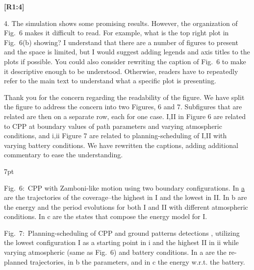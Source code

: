 \documentclass[10pt]{letter}
\newenvironment{formal}{%
  \def\FrameCommand{%
    \hspace{1pt}%
    {\color{red}\vrule width 2pt}%
    {\color{formalshade}\vrule width 4pt}%
    \colorbox{formalshade}%
  }%
  \MakeFramed{\advance\hsize-\width\FrameRestore}%
  \noindent\hspace{-4.55pt}%
  \begin{adjustwidth}{}{7pt}%
  \vspace{2pt}\vspace{2pt}%
}
{%
  \vspace{2pt}\end{adjustwidth}\endMakeFramed%
}
\begin{document}
{\hspace*{-4.5em}\textbf{[R1:4]}\vspace*{-1.9em}}


4. The simulation shows some promising results. However, the organization of Fig.~6 makes it difficult to read. For example, what is the top right plot in Fig.~6(b) showing? I understand that there are a number of figures to present and the space is limited, but I would suggest adding legends and axis titles to the plots if possible. You could also consider rewriting the caption of Fig.~6 to make it descriptive enough to be understood. Otherwise, readers have to repeatedly refer to the main text to understand what a specific plot is presenting.

{\color{blue} 


{\hspace*{-4.5em}{[R1:4]}\vspace*{-1.9em}}

Thank you for the concern regarding the readability of the figure. We have split the figure to address the concern into two Figures, 6 and 7. Subfigures that are related are then on a separate row, each for one case. I,II in Figure 6 are related to CPP at boundary values of path parameters and varying atmospheric conditions, and i,ii Figure 7 are related to planning-scheduling of I,II with varying battery conditions. We have rewritten the captions, adding additional commentary to ease the understanding.

\begin{formal}
  \footnotesize
  
  {\color{blue}Fig.~6:~\color{blue}CPP with Zamboni-like motion using two boundary configurations. In \hyperref[fig:stat]{a} are the trajectories of the coverage--the highest in {\color{red}I} and the lowest in {\color{red}II}. In {\color{red}b} are the energy and the period evolutions for both {\color{red}I} and {\color{red}II} with different atmospheric conditions. In {\color{red}c} are the states that compose the energy model for {\color{red}I}.}

  
  \vspace*{-.6ex}
  {\color{blue}
  Fig.~7:~Planning-scheduling of CPP and ground patterns detections%
  , utilizing the lowest configuration {\color{red}I} as a starting point in {\color{red}i} and the highest {\color{red}II} in {\color{red}ii} while varying atmospheric (same as Fig.~{\color{red}6}) and battery conditions. In {\color{red}a} are the re-planned trajectories, in {\color{red}b} the parameters, and in {\color{red}c} the energy w.r.t. the battery.}
  \vspace*{1ex}
\end{formal}
}
\end{document}
